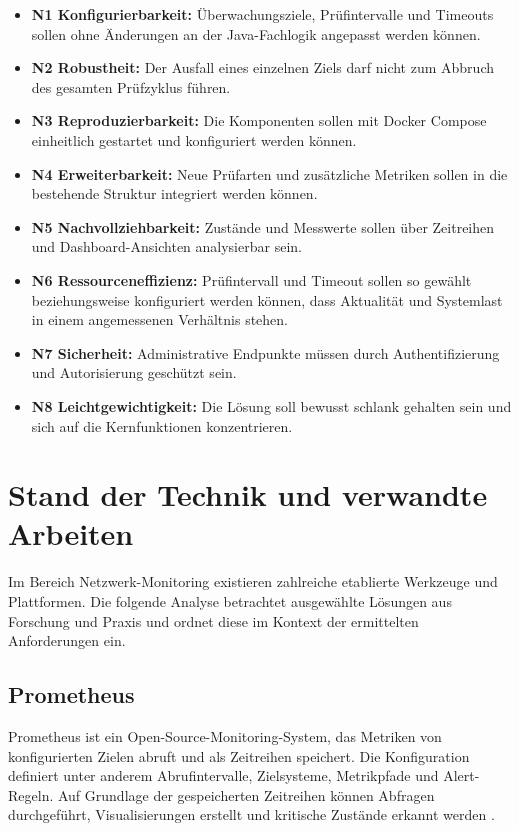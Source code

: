 \begin{itemize}
    \item \textbf{N1 Konfigurierbarkeit:} Überwachungsziele, Prüfintervalle und Timeouts sollen ohne Änderungen an der Java-Fachlogik angepasst werden können.
    \item \textbf{N2 Robustheit:} Der Ausfall eines einzelnen Ziels darf nicht zum Abbruch des gesamten Prüfzyklus führen.
    \item \textbf{N3 Reproduzierbarkeit:} Die Komponenten sollen mit Docker Compose einheitlich gestartet und konfiguriert werden können.
    \item \textbf{N4 Erweiterbarkeit:} Neue Prüfarten und zusätzliche Metriken sollen in die bestehende Struktur integriert werden können.
    \item \textbf{N5 Nachvollziehbarkeit:} Zustände und Messwerte sollen über Zeitreihen und Dashboard-Ansichten analysierbar sein.
    \item \textbf{N6 Ressourceneffizienz:} Prüfintervall und Timeout sollen so gewählt beziehungsweise konfiguriert werden können, dass Aktualität und Systemlast in einem angemessenen Verhältnis stehen.
    \item \textbf{N7 Sicherheit:} Administrative Endpunkte müssen durch Authentifizierung und Autorisierung geschützt sein.
    \item \textbf{N8 Leichtgewichtigkeit:} Die Lösung soll bewusst schlank gehalten sein und sich auf die Kernfunktionen konzentrieren.
\end{itemize}

\section{Stand der Technik und verwandte Arbeiten}
\label{sec:stand-der-technik}

Im Bereich Netzwerk-Monitoring existieren zahlreiche etablierte Werkzeuge und Plattformen. Die folgende Analyse betrachtet ausgewählte Lösungen aus Forschung und Praxis und ordnet diese im Kontext der ermittelten Anforderungen ein.

\subsection{Prometheus}
\label{subsec:prometheus}

Prometheus ist ein Open-Source-Monitoring-System, das Metriken von konfigurierten Zielen abruft und als Zeitreihen speichert. Die Konfiguration definiert unter anderem Abrufintervalle, Zielsysteme, Metrikpfade und Alert-Regeln. Auf Grundlage der gespeicherten Zeitreihen können Abfragen durchgeführt, Visualisierungen erstellt und kritische Zustände erkannt werden \cite{monitoringprometheus}.

